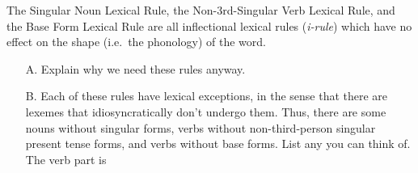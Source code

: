 \documentclass[a4paper,landscape,headrule,footrule]{foils}
\begin{document}

The Singular Noun Lexical Rule, the Non-3rd-Singular Verb Lexical
Rule, and the Base Form Lexical Rule are all inflectional lexical
rules ({\it i-rule}) which have no effect on the shape (i.e.\ the
phonology) of the word.

\begin{itemize}
\item[A.] Explain why we need these rules anyway.  
\item[B.] Each of these rules have lexical exceptions, in the sense
that there are lexemes that idiosyncratically don't undergo them.
Thus, there are some nouns without singular forms, verbs without
non-third-person singular present tense forms, and verbs without base
forms.  List any you can think of. The verb part is 
\end{itemize}


%
\end{document}
